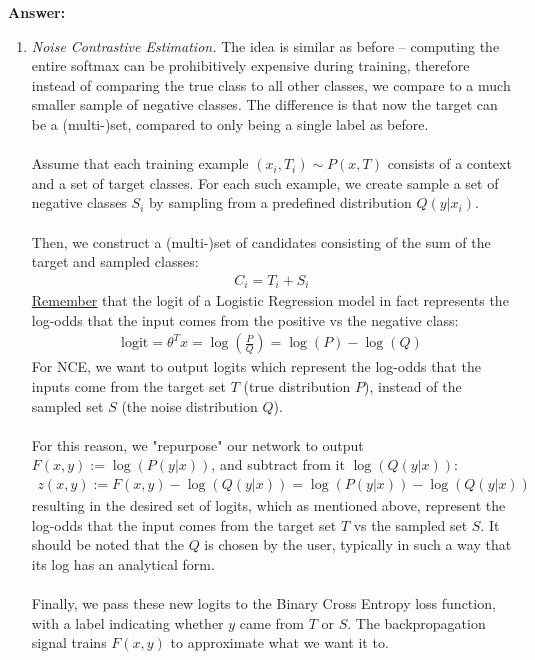 \documentclass{article}
\newenvironment{QandA}{\begin{enumerate}[label=\arabic*.]}{\end{enumerate}}
\newenvironment{ListAlph}{\begin{enumerate}[label=(\alph*)]}{\end{enumerate}}
\newenvironment{answer}{\par\normalfont \textbf{Answer:}}{}
\newcommand{\g}{\vert}
\begin{document}
\begin{QandA}
\begin{answer}
\begin{ListAlph}
            \item \textit{Noise Contrastive Estimation.} The idea is similar as before -- computing the entire softmax can be prohibitively expensive during training, therefore instead of comparing the true class to all other classes, we compare to a much smaller sample of negative classes. The difference is that now the target can be a (multi-)set, compared to only being a single label as before.\\\\
            Assume that each training example $(x_i, T_i) \sim P(x, T)$ consists of a context and a set of target classes. For each such example, we create sample a set of negative classes $S_i$ by sampling from a predefined distribution $Q(y \g x_i)$. \\\\
            Then, we construct a (multi-)set of candidates consisting of the sum of the target and sampled classes:
            \begin{align*}
                C_i = T_i + S_i
            \end{align*}
            \href{https://math.stackexchange.com/a/4183626}{Remember} that the logit of a Logistic Regression model in fact represents the log-odds that the input comes from the positive vs the negative class:
            \begin{align*}
                \text{logit} = \theta^T x = \log \left(\frac{P}{Q} \right) = \log(P) - \log(Q)
            \end{align*}
            For NCE, we want to output logits which represent the log-odds that the inputs come from the target set $T$ (true distribution $P$), instead of the sampled set $S$ (the noise distribution $Q$). \\\\
            For this reason, we "repurpose" our network to output $F(x, y) := \log(P(y \g x))$, and subtract from it $\log(Q(y \g x))$:
            \begin{align*}
                z(x, y) := F(x, y) - \log(Q(y \g x)) = \log(P(y \g x)) - \log(Q(y \g x))
            \end{align*}
            resulting in the desired set of logits, which as mentioned above, represent the log-odds that the input comes from the target set $T$ vs the sampled set $S$. It should be noted that the $Q$ is chosen by the user, typically in such a way that its log has an analytical form. \\\\
            Finally, we pass these new logits to the Binary Cross Entropy loss function, with a label indicating whether $y$ came from $T$ or $S$. The backpropagation signal trains $F(x, y)$ to approximate what we want it to.


\end{ListAlph}
\end{answer}
\end{QandA}
\end{document}
